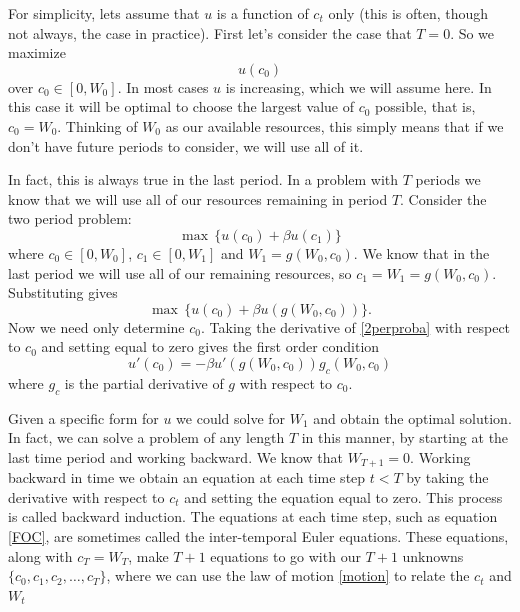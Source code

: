 For simplicity, lets assume that $u$ is a function of $c_t$ only (this is often, though not always, the case in practice).
 First let's consider the case that $T=0$.  So we maximize
\begin{equation}\label{1perprob}
u(c_0)
\end{equation}
over $c_0 \in [0,W_0]$.  In most cases $u$ is increasing, which we will assume here.  In this case it will be optimal to choose
 the largest value of $c_0$ possible, that is, $c_0 = W_0$.  Thinking of $W_0$ as our available resources, this simply means
 that if we don't have future periods to consider, we will use all of it.

In fact, this is always true in the last period.  In a problem with $T$ periods we know that we will use all of our resources
remaining in period $T$.  Consider the two period problem:
\begin{equation}
\label{2perprob}
\max \, \{u(c_0) + \beta u(c_1)\}
\end{equation}
where $c_0 \in [0,W_0]$, $c_1 \in [0,W_1]$ and $W_1 = g(W_0,c_0)$.  We know that in the last period we will use all of our
remaining resources, so $c_1 = W_1=g(W_0,c_0)$.  Substituting gives
\begin{equation}
\label{2perproba}
\max \, \{u(c_0) + \beta u(g(W_0,c_0))\}.
\end{equation}
Now we need only determine $c_0$.  Taking the derivative of \eqref{2perproba} with respect to $c_0$ and setting equal to zero
gives the first order condition
\begin{equation}
\label{FOC}
u'(c_0) = -\beta u'(g(W_0,c_0))g_c(W_0,c_0)
\end{equation}
where $g_c$ is the partial derivative of $g$ with respect to $c_0$.

Given a specific form for $u$ we could solve for $W_1$ and obtain the optimal solution.  In fact, we can solve a problem of
any length $T$ in this manner, by starting at the last time period and working backward.  We know that $W_{T+1} = 0$.  Working
backward in time we obtain an equation at each time step $t<T$ by taking the derivative with respect to $c_t$ and setting the equation equal to zero.  This process is called backward induction.  The equations at each time step, such as equation \eqref{FOC}, are sometimes called the inter-temporal Euler equations.  These equations, along with $c_T = W_T$, make $T+1$ equations to go with our $T+1$ unknowns $\{c_0,c_1,c_2,\ldots,c_T\}$, where we can use the law of motion \eqref{motion} to relate the $c_t$ and $W_t$

